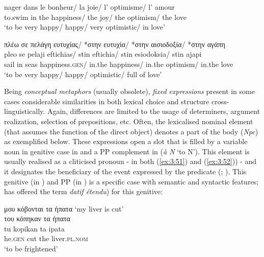 \documentclass[output=paper]{langsci/langscibook}
\begin{document}
\begin{exe}
\ex \label{ex:3:49} 
\gll nager dans le bonheur/ la joie/ l’  optimisme/ l’ amour\\
 to.swim in the happiness/ the joy/ the optimism/ the love \\
\glt ‘to be very happy/ happy/  very optimistic/  in love’
\end{exe}

\begin{exe}
\ex \label{ex:3:50}
\glll πλέω σε πελάγη ευτυχίας/ *στην ευτυχία/ *στην αισιοδοξία/ *στην αγάπη \\
pleo   se pelaji   eftichias/ stin eftichia/ stin esiodoksia/ stin ajapi\\
sail in seas happiness.\textsc{gen}/ in.the happiness/ in.the optimism/ in.the love\\
\glt %
‘to be very happy/ happy/ optimistic/ full of love’
\end{exe}


Being \textit{conceptual metaphors} (usually obsolete),
\textit{fixed expressions} present in \linebreak some cases
considerable similarities in both lexical choice and structure
cross-linguistically. Again, differences are limited to the usage of
determiners, argument realization, selection of prepositions, etc.
Often, the lexicalised nominal element (that assumes the function of
the direct object) denotes a part of the body (\textit{Npc}) as
exemplified below. These expressions open a slot that is filled by a
variable noun in genitive case in  and a PP complement in  (\textit{à N} ‘to N’). This element is usually realised as a cliticised
pronoun - in both  (\ref{ex:3:51}) and   (\ref{ex:3:52})) - and it designates the
beneficiary of the event expressed by the predicate (\citealt{leclere1976}; \citealt{fotop1993genitif}). This genitive (in ) and PP (in ) is a specific
case with semantic and syntactic features; \cite{leclere1976} has offered the term 
\textit{datif étendu}) for this genitive:

\begin{exe}
\ex \label{ex:3:51}
μου κόβονται τα ήπατα `my liver is cut'\\
\glll του κόπηκαν τα ήπατα \\
tu kopikan ta ipata\\
he.\textsc{gen} cut the liver.\textsc{pl.nom}\\
\glt %
`to be frightened’
\end{exe}
\end{document}
